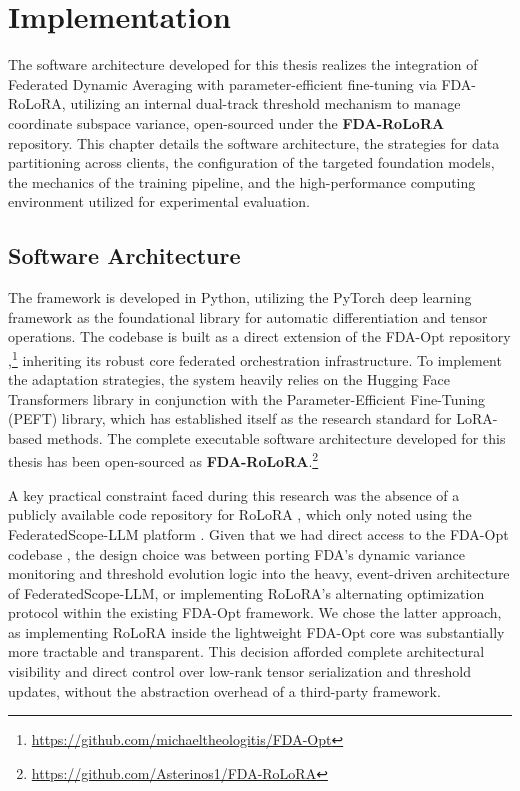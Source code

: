 \chapter{Implementation}
\label{chap:implementation}

The software architecture developed for this thesis realizes the integration of Federated Dynamic Averaging with parameter-efficient fine-tuning via FDA-RoLoRA, utilizing an internal dual-track threshold mechanism to manage coordinate subspace variance, open-sourced under the \textbf{FDA-RoLoRA} repository. This chapter details the software architecture, the strategies for data partitioning across clients, the configuration of the targeted foundation models, the mechanics of the training pipeline, and the high-performance computing environment utilized for experimental evaluation.

\section{Software Architecture}
\label{sec:impl_architecture}

The framework is developed in Python, utilizing the PyTorch deep learning framework as the foundational library for automatic differentiation and tensor operations. The codebase is built as a direct extension of the FDA-Opt repository \cite{theologitis2025fda},\footnote{\url{https://github.com/michaeltheologitis/FDA-Opt}} inheriting its robust core federated orchestration infrastructure. To implement the adaptation strategies, the system heavily relies on the Hugging Face Transformers library in conjunction with the Parameter-Efficient Fine-Tuning (PEFT) library, which has established itself as the research standard for LoRA-based methods. The complete executable software architecture developed for this thesis has been open-sourced as \textbf{FDA-RoLoRA}.\footnote{\url{https://github.com/Asterinos1/FDA-RoLoRA}}

A key practical constraint faced during this research was the absence of a publicly available code repository for RoLoRA \cite{chen2025robust}, which only noted using the FederatedScope-LLM platform \cite{kuang2023federatedscope}. Given that we had direct access to the FDA-Opt codebase \cite{theologitis2025fda}, the design choice was between porting FDA's dynamic variance monitoring and threshold evolution logic into the heavy, event-driven architecture of FederatedScope-LLM, or implementing RoLoRA's alternating optimization protocol within the existing FDA-Opt framework. We chose the latter approach, as implementing RoLoRA inside the lightweight FDA-Opt core was substantially more tractable and transparent. This decision afforded complete architectural visibility and direct control over low-rank tensor serialization and threshold updates, without the abstraction overhead of a third-party framework.


